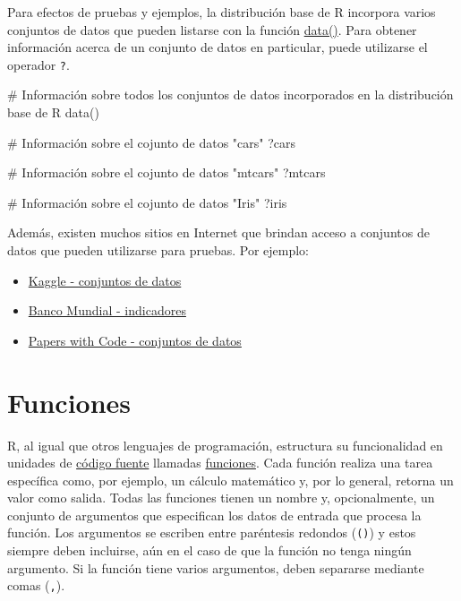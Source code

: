 \documentclass[
  letterpaper,
  DIV=11,
  numbers=noendperiod]{scrreprt}
\newenvironment{Shaded}{\begin{snugshade}}{\end{snugshade}}
\newcommand{\CommentTok}[1]{\textcolor[rgb]{0.37,0.37,0.37}{#1}}
\newcommand{\FunctionTok}[1]{\textcolor[rgb]{0.28,0.35,0.67}{#1}}
\newcommand{\NormalTok}[1]{\textcolor[rgb]{0.00,0.23,0.31}{#1}}
\providecommand{\tightlist}{%
  \setlength{\itemsep}{0pt}\setlength{\parskip}{0pt}}\usepackage{longtable,booktabs,array}
\begin{document}
Para efectos de pruebas y ejemplos, la distribución base de R incorpora
varios conjuntos de datos que pueden listarse con la función
\href{https://rdrr.io/r/utils/data.html}{data()}. Para obtener
información acerca de un conjunto de datos en particular, puede
utilizarse el operador \texttt{?}.

\begin{Shaded}
\begin{Highlighting}[]
\CommentTok{\# Información sobre todos los conjuntos de datos incorporados en la distribución base de R}
\FunctionTok{data}\NormalTok{()}

\CommentTok{\# Información sobre el cojunto de datos "cars"}
\NormalTok{?cars}

\CommentTok{\# Información sobre el cojunto de datos "mtcars"}
\NormalTok{?mtcars}

\CommentTok{\# Información sobre el cojunto de datos "Iris"}
\NormalTok{?iris}
\end{Highlighting}
\end{Shaded}

Además, existen muchos sitios en Internet que brindan acceso a conjuntos
de datos que pueden utilizarse para pruebas. Por ejemplo:

\begin{itemize}
\tightlist
\item
  \href{https://www.kaggle.com/datasets}{Kaggle - conjuntos de datos}
\item
  \href{https://data.worldbank.org/indicator}{Banco Mundial -
  indicadores}
\item
  \href{https://paperswithcode.com/datasets}{Papers with Code -
  conjuntos de datos}
\end{itemize}

\hypertarget{funciones}{%
\section{Funciones}\label{funciones}}

R, al igual que otros lenguajes de programación, estructura su
funcionalidad en unidades de
\href{https://en.wikipedia.org/wiki/Source_code}{código fuente} llamadas
\href{https://cran.r-project.org/doc/manuals/r-release/R-lang.html\#Functions}{funciones}.
Cada función realiza una tarea específica como, por ejemplo, un cálculo
matemático y, por lo general, retorna un valor como salida. Todas las
funciones tienen un nombre y, opcionalmente, un conjunto de argumentos
que especifican los datos de entrada que procesa la función. Los
argumentos se escriben entre paréntesis redondos (\texttt{()}) y estos
siempre deben incluirse, aún en el caso de que la función no tenga
ningún argumento. Si la función tiene varios argumentos, deben separarse
mediante comas (\texttt{,}).
\end{document}
